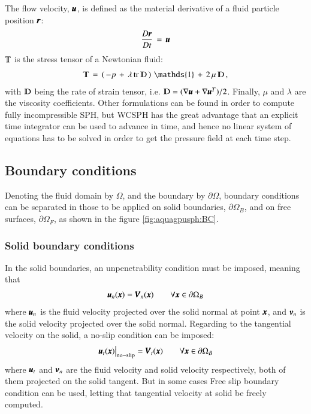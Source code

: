 The flow velocity, $\pmb{u}$, is defined as the material derivative of a fluid
particle position $\pmb{r}$:
%
\begin{eqnarray}
\frac{D \pmb{r}}{D t} \, = \, \pmb{u}
\end{eqnarray}
%
$\varmathbb{T}$ is the stress tensor of a Newtonian fluid:
%
\begin{eqnarray}
\varmathbb{T}  \, = \, \left(\, - p \, + \, \lambda \, \textrm{tr}\,  \varmathbb{D} \,\right) \, \mathds{1}  \,+  \,2 \, \mu \, \varmathbb{D} \,,
\end{eqnarray}
%
with $\varmathbb{D}$ being the rate of strain tensor, i.e. $\varmathbb{D} = ( \nabla \bs{u} + \nabla \bs{u}^{T} )/2$.\rc
%
Finally, $\mu$ and $\lambda$  are the viscosity coefficients. \rc
%
Other formulations can be found in order to compute fully incompressible SPH, but
WCSPH has the great advantage that an explicit time integrator can be used to
advance in time, and hence no linear system of equations has to be solved in order to get
the pressure field at each time step.
%
\subsection{Boundary conditions}
%
Denoting the fluid domain by $\Omega$, and the boundary by $\partial \Omega$,
boundary conditions can be separated in those to be applied on solid boundaries,
$\partial \Omega_B$, and on free surfaces, $\partial \Omega_F$, as shown in the
figure \ref{fig:aquagpusph:BC}.
%
\subsubsection{Solid boundary conditions}
%
In the solid boundaries, an unpenetrability condition must be imposed, meaning that
%
\begin{eqnarray}
\pmb{u}_n(\pmb{x}) = \pmb{V}_n(\pmb{x}) \qquad \forall \pmb{x} \in \partial\Omega_B
\end{eqnarray}
%
where $\pmb{u}_n$ is the fluid velocity projected over the solid normal at point
$\pmb{x}$, and $\pmb{v}_n$ is the solid velocity projected over the solid normal.\rc
%
Regarding to the tangential velocity on the solid, a no-slip condition can be imposed:
%
\begin{eqnarray}
\pmb{u}_t(\pmb{x}) \big\vert_{\mathrm{no-slip}} = \pmb{V}_t(\pmb{x})  \qquad \forall \pmb{x} \in \partial\Omega_B
\end{eqnarray}
%
where $\pmb{u}_t$ and $\pmb{v}_n$ are the fluid velocity and solid velocity
respectively, both of them projected on the solid tangent. But in some cases Free slip
boundary condition can be used, letting that tangential velocity at solid be freely
computed.
%
